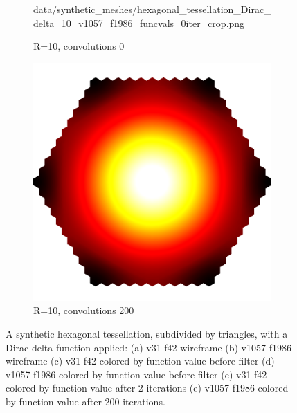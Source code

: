\begin{figure}[ht]
\begin{subfigure}[b]{0.32\linewidth}
		{data/synthetic_meshes/hexagonal_tessellation_Dirac_delta_10_v1057_f1986_funcvals_0iter_crop.png}
		\caption{R=10, convolutions 0}\label{fig:hex.e}
	\end{subfigure}
	\begin{subfigure}[b]{0.32\linewidth}
		\includegraphics[width=\linewidth]{data/synthetic_meshes/hexagonal_tessellation_Dirac_delta_10_v1057_f1986_funcvals_200iter_crop.png}
		\caption{R=10, convolutions 200}\label{fig:hex.f}
	\end{subfigure}
	{\caption[Synthetic Hexagonal Tessellations, Dirac delta function]{A synthetic hexagonal tessellation, subdivided by triangles, with a Dirac delta function applied: (a) v31 f42 wireframe (b) v1057 f1986 wireframe (c) v31 f42 colored by function value before filter (d) v1057 f1986 colored by function value before filter (e) v31 f42 colored by function value after 2 iterations (e) v1057 f1986 colored by function value after 200 iterations.
	}\label{fig:hex}}
\end{figure}
\todoCitation{}
